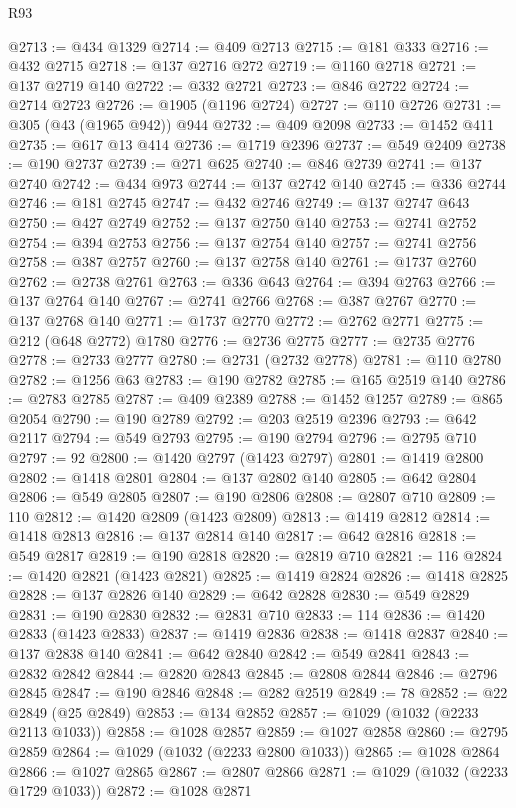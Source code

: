 \begin{lexlean}{R93}
\begin{coremodule}
@2713 := @434 @1329
@2714 := @409 @2713
@2715 := @181 @333
@2716 := @432 @2715
@2718 := @137 @2716 @272
@2719 := @1160 @2718
@2721 := @137 @2719 @140
@2722 := @332 @2721
@2723 := @846 @2722
@2724 := @2714 @2723
@2726 := @1905 (@1196 @2724)
@2727 := @110 @2726
@2731 := @305 (@43 (@1965 @942)) @944
@2732 := @409 @2098
@2733 := @1452 @411
@2735 := @617 @13 @414
@2736 := @1719 @2396
@2737 := @549 @2409
@2738 := @190 @2737
@2739 := @271 @625
@2740 := @846 @2739
@2741 := @137 @2740
@2742 := @434 @973
@2744 := @137 @2742 @140
@2745 := @336 @2744
@2746 := @181 @2745
@2747 := @432 @2746
@2749 := @137 @2747 @643
@2750 := @427 @2749
@2752 := @137 @2750 @140
@2753 := @2741 @2752
@2754 := @394 @2753
@2756 := @137 @2754 @140
@2757 := @2741 @2756
@2758 := @387 @2757
@2760 := @137 @2758 @140
@2761 := @1737 @2760
@2762 := @2738 @2761
@2763 := @336 @643
@2764 := @394 @2763
@2766 := @137 @2764 @140
@2767 := @2741 @2766
@2768 := @387 @2767
@2770 := @137 @2768 @140
@2771 := @1737 @2770
@2772 := @2762 @2771
@2775 := @212 (@648 @2772) @1780
@2776 := @2736 @2775
@2777 := @2735 @2776
@2778 := @2733 @2777
@2780 := @2731 (@2732 @2778)
@2781 := @110 @2780
@2782 := @1256 @63
@2783 := @190 @2782
@2785 := @165 @2519 @140
@2786 := @2783 @2785
@2787 := @409 @2389
@2788 := @1452 @1257
@2789 := @865 @2054
@2790 := @190 @2789
@2792 := @203 @2519 @2396
@2793 := @642 @2117
@2794 := @549 @2793
@2795 := @190 @2794
@2796 := @2795 @710
@2797 := 92
@2800 := @1420 @2797 (@1423 @2797)
@2801 := @1419 @2800
@2802 := @1418 @2801
@2804 := @137 @2802 @140
@2805 := @642 @2804
@2806 := @549 @2805
@2807 := @190 @2806
@2808 := @2807 @710
@2809 := 110
@2812 := @1420 @2809 (@1423 @2809)
@2813 := @1419 @2812
@2814 := @1418 @2813
@2816 := @137 @2814 @140
@2817 := @642 @2816
@2818 := @549 @2817
@2819 := @190 @2818
@2820 := @2819 @710
@2821 := 116
@2824 := @1420 @2821 (@1423 @2821)
@2825 := @1419 @2824
@2826 := @1418 @2825
@2828 := @137 @2826 @140
@2829 := @642 @2828
@2830 := @549 @2829
@2831 := @190 @2830
@2832 := @2831 @710
@2833 := 114
@2836 := @1420 @2833 (@1423 @2833)
@2837 := @1419 @2836
@2838 := @1418 @2837
@2840 := @137 @2838 @140
@2841 := @642 @2840
@2842 := @549 @2841
@2843 := @2832 @2842
@2844 := @2820 @2843
@2845 := @2808 @2844
@2846 := @2796 @2845
@2847 := @190 @2846
@2848 := @282 @2519
@2849 := 78
@2852 := @22 @2849 (@25 @2849)
@2853 := @134 @2852
@2857 := @1029 (@1032 (@2233 @2113 @1033))
@2858 := @1028 @2857
@2859 := @1027 @2858
@2860 := @2795 @2859
@2864 := @1029 (@1032 (@2233 @2800 @1033))
@2865 := @1028 @2864
@2866 := @1027 @2865
@2867 := @2807 @2866
@2871 := @1029 (@1032 (@2233 @1729 @1033))
@2872 := @1028 @2871

\end{coremodule}
\end{lexlean}
